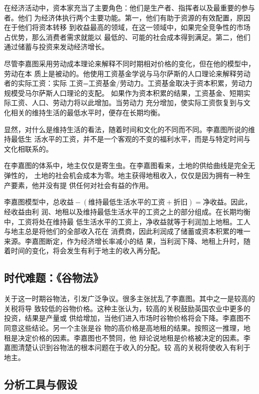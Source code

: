 在经济活动中，资本家充当了主要角色：他们是生产者、指挥者以及最重要的参与者。他们
为经济体执行两个主要功能。第一，他们有助于资源的有效配置，原因在于他们将资本转移
到收益最高的领域，在这一领域中，如果完全竞争性的市场占优势，那么消费者需求就能以
最低的、可能的社会成本得到满足。第二，他们通过储蓄与投资来发动经济增长。

尽管李嘉图采用劳动成本理论来解释不同时期相对价格的变化，但在他的模型中，劳动在本
质上是被动的。他使用工资基金学说与马尔萨斯的人口理论来解释劳动者的实际工资：实际
工资=工资基金/劳动力。工资基金取决于资本积累，劳动力规模受马尔萨斯人口理论的支配。
如果作为资本积累的结果，工资基金、短期实际工资、人口、劳动力将以此增加。当劳动力
充分增加，使实际工资恢复到与文化相关的维持生活的最低水平时，便存在长期均衡。

显然，对什么是维持生活的看法，随着时间和文化的不同而不同。李嘉图所说的维持最低生
活水平的工资，并不是一个客观的不变的福利水平，而是与特定时间与文化相联系的。

在李嘉图的体系中，地主仅仅是寄生虫。在李嘉图看来，土地的供给曲线是完全无弹性的，
土地的社会机会成本为零。地主获得地租收入，仅仅是因为拥有一种生产要素，他并没有提
供任何对社会有益的作用。

李嘉图模型中，$总收益 - (维持最低生活水平的工资+折旧)=净收益$。因此，经收益由利
润、地租以及维持最低生活水平的工资之上的部分组成。在长期均衡中，工资将处在维持最
低生活水平的工资上，净收益就等于利润加上地租。工人与地主总是将他们的全部收入花在
消费商，因此利润成了储蓄或资本积累的唯一来源。李嘉图断定，作为经济增长率减小的结
果，当利润下降、地租上升时，随着时间的变化，将会发生有利于地主的收入再分配。

\subsection{时代难题：《谷物法》}

关于这一时期谷物法，引发广泛争议。很多主张扰乱了李嘉图。其中之一是较高的关税将导
致较低的谷物价格。这种主张认为，较高的关税鼓励英国农业中更多的投资，结果是产量或
供给增加，当他们进入市场时谷物价格将会下降。李嘉图不同意这些结论。另一个主张是谷
物的高价格是高地租的结果。按照这一推理，地租是决定价格的因素。李嘉图也不赞同，他
辩论说地租是价格被决定的因素。李嘉图清楚认识到谷物法的根本问题在于收入的分配。较
高的关税将使收入有利于地主。

\subsection{分析工具与假设}

